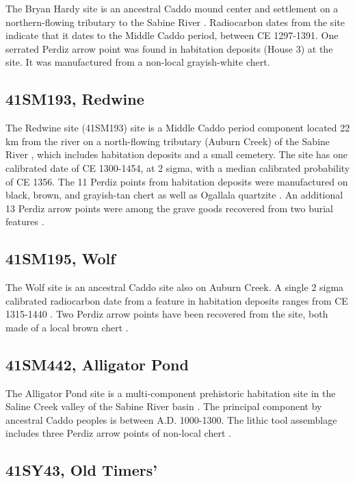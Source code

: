 \documentclass[review]{elsarticle}
\begin{document}
The Bryan Hardy site is an ancestral Caddo mound center and settlement on a northern-flowing tributary to the Sabine River \citep{RN3231}. Radiocarbon dates from the site indicate that it dates to the Middle Caddo period, between CE 1297-1391. One serrated Perdiz arrow point was found in habitation deposits (House 3) at the site. It was manufactured from a non-local grayish-white chert.

\subsection*{41SM193, Redwine}

The Redwine site (41SM193) site is a Middle Caddo period component located 22 km from the river on a north-flowing tributary (Auburn Creek) of the Sabine River \citep{RN3230}, which includes habitation deposits and a small cemetery. The site has one calibrated date of CE 1300-1454, at 2 sigma, with a median calibrated probability of CE 1356. The 11 Perdiz points from habitation deposits were manufactured on black, brown, and grayish-tan chert as well as Ogallala quartzite \citep[14]{RN3230}. An additional 13 Perdiz arrow points were among the grave goods recovered from two burial features \citep[35]{RN3230}.

\subsection*{41SM195, Wolf}

The Wolf site is an ancestral Caddo site also on Auburn Creek. A single 2 sigma calibrated radiocarbon date from a feature in habitation deposits ranges from CE 1315-1440 \citep{RN3220}. Two Perdiz arrow points have been recovered from the site, both made of a local brown chert \citep[4,5,Figure 8]{RN3220}.

\subsection*{41SM442, Alligator Pond}

The Alligator Pond site is a multi-component prehistoric habitation site in the Saline Creek valley of the Sabine River basin \citep{RN2375,RN2374}. The principal component by ancestral Caddo peoples is between A.D. 1000-1300. The lithic tool assemblage includes three Perdiz arrow points of non-local chert \citep[Figure 19c, e, j]{RN2374}.

\subsection*{41SY43, Old Timers'}
\end{document}
